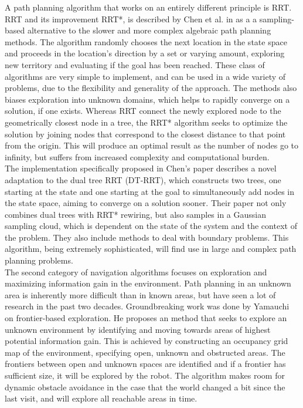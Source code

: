 A path planning algorithm that works on an entirely different principle is RRT. RRT and its improvement RRT*, is described by Chen et al. in \cite{8329210} as a a sampling-based alternative to the slower and more complex algebraic path planning methods. The algorithm randomly chooses the next location in the state space and proceeds in the location's direction by a set or varying amount, exploring new territory and evaluating if the goal has been reached. These class of algorithms are very simple to implement, and can be used in a wide variety of problems, due to the flexibility and generality of the approach. The methods also biases exploration into unknown domains, which helps to rapidly converge on a solution, if one exists. Whereas RRT connect the newly explored node to the geometrically closest node in a tree, the RRT* algorithm seeks to optimize the solution by joining nodes that correspond to the closest distance to that point from the origin. This will produce an optimal result as the number of nodes go to infinity, but suffers from increased complexity and computational burden. \\

The implementation specifically proposed in Chen's paper describes a novel adaptation to the dual tree RRT (DT-RRT), which constructs two trees, one starting at the state and one starting at the goal to simultaneously add nodes in the state space, aiming to converge on a solution sooner. Their paper not only combines dual trees with RRT* rewiring, but also samples in a Gaussian sampling cloud, which is dependent on the state of the system and the context of the problem. They also include methods to deal with boundary problems. This algorithm, being extremely sophisticated, will find use in large and complex path planning problems. \\

The second category of navigation algorithms focuses on exploration and maximizing information gain in the environment. Path planning in an unknown area is inherently more difficult than in known areas, but have seen a lot of research in the past two decades. Groundbreaking work was done by Yamauchi \cite{613851} on frontier-based exploration. He proposes an method that seeks to explore an unknown environment by identifying and moving towards areas of highest potential information gain. This is achieved by constructing an occupancy grid map of the environment, specifying open, unknown and obstructed areas. The frontiers between open and unknown spaces are identified and if a frontier has sufficient size, it will be explored by the robot. The algorithm makes room for dynamic obstacle avoidance in the case that the world changed a bit since the last visit, and will explore all reachable areas in time. \\

